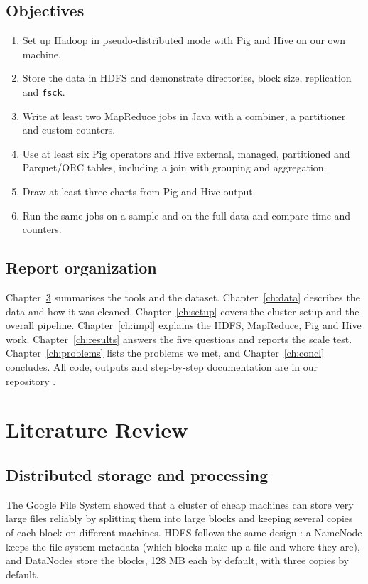 \documentclass[12pt,a4paper]{report}
\begin{document}
\section{Objectives}
\begin{enumerate}
\item Set up Hadoop in pseudo-distributed mode with Pig and Hive on our own machine.
\item Store the data in HDFS and demonstrate directories, block size, replication and \texttt{fsck}.
\item Write at least two MapReduce jobs in Java with a combiner, a partitioner and custom counters.
\item Use at least six Pig operators and Hive external, managed, partitioned and Parquet/ORC tables, including a join with grouping and aggregation.
\item Draw at least three charts from Pig and Hive output.
\item Run the same jobs on a sample and on the full data and compare time and counters.
\end{enumerate}

\section{Report organization}
Chapter~\ref{ch:lit} summarises the tools and the dataset. Chapter~\ref{ch:data} describes the data and how it was cleaned. Chapter~\ref{ch:setup} covers the cluster setup and the overall pipeline. Chapter~\ref{ch:impl} explains the HDFS, MapReduce, Pig and Hive work. Chapter~\ref{ch:results} answers the five questions and reports the scale test. Chapter~\ref{ch:problems} lists the problems we met, and Chapter~\ref{ch:concl} concludes. All code, outputs and step-by-step documentation are in our repository \cite{repo}.

\chapter{Literature Review}\label{ch:lit}

\section{Distributed storage and processing}
The Google File System \cite{gfs2003} showed that a cluster of cheap machines can store very large files reliably by splitting them into large blocks and keeping several copies of each block on different machines. HDFS follows the same design \cite{hdfs2010}: a NameNode keeps the file system metadata (which blocks make up a file and where they are), and DataNodes store the blocks, 128 MB each by default, with three copies by default.
\end{document}
